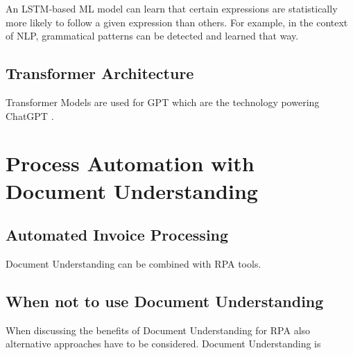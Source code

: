 An LSTM-based ML model can learn that certain expressions are statistically more likely to follow a given expression than others. For example, in the context of \ac{NLP}, grammatical patterns can be detected and learned that way.
\cite{hochreiter1997long,hochreiter2001gradient}

\subsection{Transformer Architecture}
\label{Transformer}
Transformer Models are used for \ac{GPT} which are the technology powering ChatGPT \cite{brown2020language}.
\cite{vaswaniattentionneed}

\section{Process Automation with Document Understanding}
\subsection{Automated Invoice Processing}
Document Understanding can be combined with \ac{RPA} tools.
\cite{leiAI}
\subsection{When not to use Document Understanding}
When discussing the benefits of Document Understanding for \ac{RPA} also alternative approaches have to be considered. Document Understanding is 

\cite{alt2002integrierte,au2001should}